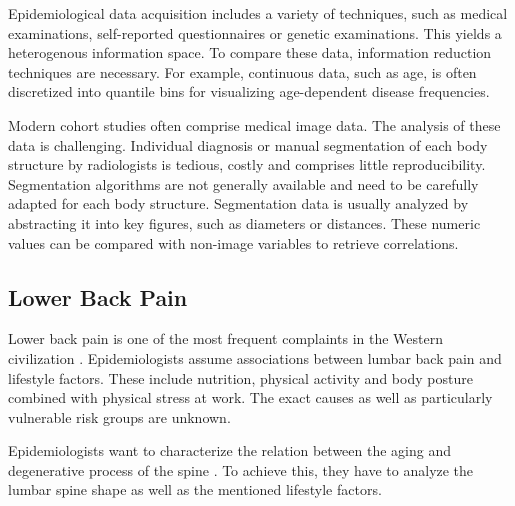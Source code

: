 \documentclass[a4paper,twoside]{style/article}
\begin{document}
Epidemiological data acquisition includes a variety of techniques, such as medical examinations, self-reported questionnaires or genetic examinations.
This yields a heterogenous information space.
To compare these data, information reduction techniques are necessary.
For example, continuous data, such as age, is often discretized into quantile bins for visualizing age-dependent disease frequencies.

Modern cohort studies often comprise medical image data.
The analysis of these data is challenging.
Individual diagnosis or manual segmentation of each body structure by radiologists is tedious, costly and comprises little reproducibility.
Segmentation algorithms are not generally available and need to be carefully adapted for each body structure.
Segmentation data is usually analyzed by abstracting it into key figures, such as diameters or distances.
These numeric values can be compared with non-image variables to retrieve correlations.
\subsection{Lower Back Pain}
Lower back pain is one of the most frequent complaints in the Western civilization \cite{Hoy2010}.
Epidemiologists assume associations between lumbar back pain and lifestyle factors.
These include nutrition, physical activity and body posture combined with physical stress at work.
The exact causes as well as particularly vulnerable risk groups are unknown.

Epidemiologists want to characterize the relation between the aging and degenerative process of the spine \cite{Szpalski2005}. %
To achieve this, they have to analyze the lumbar spine shape as well as the mentioned lifestyle factors.
\end{document}
